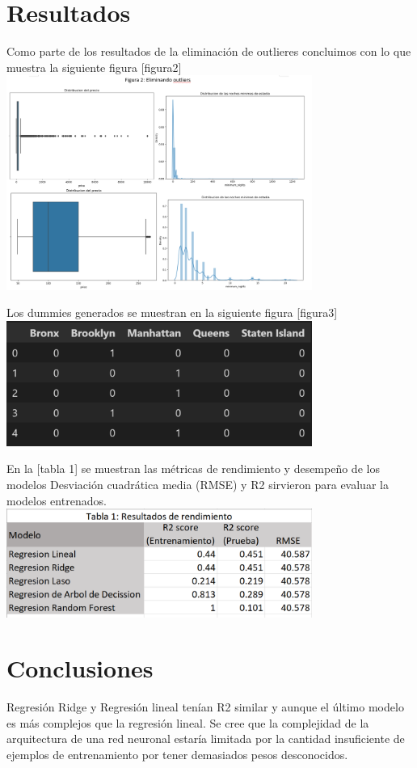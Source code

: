\documentclass[conference]{IEEEtran}
\begin{document}
\section{Resultados}
Como parte de los resultados de la eliminación de outlieres concluimos con lo que muestra la siguiente figura [figura2]
\includegraphics[width=10cm]{images/figura2.png}

Los dummies generados se muestran en la siguiente figura [figura3]
\includegraphics[width=10cm]{images/figura3.png}

En la [tabla 1] se muestran las métricas de rendimiento y desempeño de los modelos
Desviación cuadrática media (RMSE) y R2
sirvieron para evaluar la
modelos entrenados.
\includegraphics[width=10cm]{images/tabla1.png}

\section{Conclusiones}
Regresión Ridge y Regresión lineal tenían R2 similar y 
aunque el último modelo es más complejos que la regresión lineal. Se cree que la complejidad de la arquitectura
de una red neuronal estaría limitada por la cantidad insuficiente de ejemplos de entrenamiento por tener demasiados
pesos desconocidos.
\end{document}
